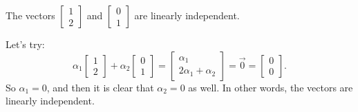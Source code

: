 \begin{example} The vectors
$\left[ \begin{smallmatrix} 1 \\ 2 \end{smallmatrix} \right]$
and
$\left[ \begin{smallmatrix} 0 \\ 1 \end{smallmatrix} \right]$
are linearly independent.
\end{example}

\begin{exampleSol}
Let's try:
\begin{equation*}
\alpha_1
\begin{bmatrix} 1 \\ 2 \end{bmatrix}
+
\alpha_2
\begin{bmatrix} 0 \\ 1 \end{bmatrix}
=
\begin{bmatrix} \alpha_1 \\ 2 \alpha_1 + \alpha_2 \end{bmatrix}
=
\vec{0} =
\begin{bmatrix} 0 \\ 0 \end{bmatrix} .
\end{equation*}
So $\alpha_1 = 0$, and then it is clear that $\alpha_2 = 0$ as well.  In
other words, the vectors are linearly independent.
\end{exampleSol}


